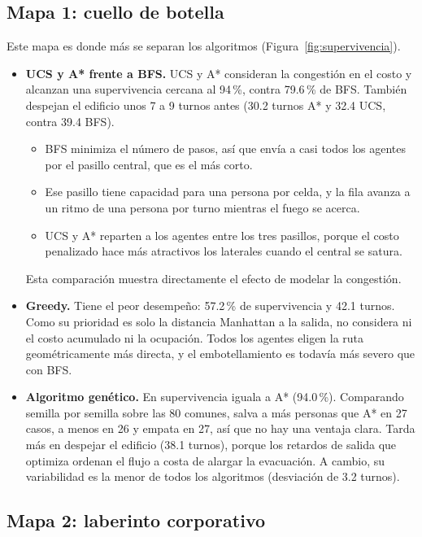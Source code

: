 \documentclass[11pt,a4paper]{article}
\begin{document}
\subsection{Mapa 1: cuello de botella}

Este mapa es donde más se separan los algoritmos (Figura~\ref{fig:supervivencia}).

\begin{itemize}
    \item \textbf{UCS y A* frente a BFS.} UCS y A* consideran la congestión en el costo y alcanzan una supervivencia cercana al 94\,\%, contra 79.6\,\% de BFS. También despejan el edificio unos 7 a 9 turnos antes (30.2 turnos A* y 32.4 UCS, contra 39.4 BFS).
    \begin{itemize}
        \item BFS minimiza el número de pasos, así que envía a casi todos los agentes por el pasillo central, que es el más corto.
        \item Ese pasillo tiene capacidad para una persona por celda, y la fila avanza a un ritmo de una persona por turno mientras el fuego se acerca.
        \item UCS y A* reparten a los agentes entre los tres pasillos, porque el costo penalizado hace más atractivos los laterales cuando el central se satura.
    \end{itemize}
    Esta comparación muestra directamente el efecto de modelar la congestión.
    \item \textbf{Greedy.} Tiene el peor desempeño: 57.2\,\% de supervivencia y 42.1 turnos. Como su prioridad es solo la distancia Manhattan a la salida, no considera ni el costo acumulado ni la ocupación. Todos los agentes eligen la ruta geométricamente más directa, y el embotellamiento es todavía más severo que con BFS.
    \item \textbf{Algoritmo genético.} En supervivencia iguala a A* (94.0\,\%). Comparando semilla por semilla sobre las 80 comunes, salva a más personas que A* en 27 casos, a menos en 26 y empata en 27, así que no hay una ventaja clara. Tarda más en despejar el edificio (38.1 turnos), porque los retardos de salida que optimiza ordenan el flujo a costa de alargar la evacuación. A cambio, su variabilidad es la menor de todos los algoritmos (desviación de 3.2 turnos).
\end{itemize}

\subsection{Mapa 2: laberinto corporativo}
\end{document}
